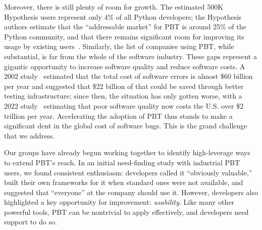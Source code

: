 Moreover, there is still plenty of room
for growth.
The estimated  500K
Hypothesis users represent only 4\% of all Python developers; the Hypothesis
authors estimate that the ``addressable market'' for PBT is around
25\% of the Python
community, and that there remains significant room for
improving its usage by existing users~\cite{ZacPersonalCommunication,noauthor_python_nodate}.
Similarly, the list of
companies using PBT, while substantial, is far from the whole of the software
industry.
These gaps represent a gigantic opportunity to increase software quality
and reduce software costs.
A 2002 study~\cite{2002economic} estimated that the total cost of software errors is almost
\$60 billion per year and suggested that \$22 billion of that could be
saved through
better testing infrastructure; since then, the situation has only gotten worse, with a 2022
study~\cite{krasner2022cost} estimating that poor software quality now
costs the U.S.{} over \$2 trillion per
year. Accelerating the adoption of PBT thus stands to make a
significant dent
in the global cost of software bugs.  This is the grand challenge that
we address.

Our groups have already begun working together to identify
high-leverage ways to extend PBT's reach.
In an initial need-finding study with industrial PBT users, we found consistent enthusiasm:
developers called it
``obviously valuable,'' built their own
frameworks for it when standard ones were not available, and suggested that ``everyone''
at the company should use it.  However, developers
also highlighted a key opportunity for improvement: {\em usability}.
%
Like
many other powerful tools, PBT can be nontrivial to apply effectively, and developers
need support to do so.

